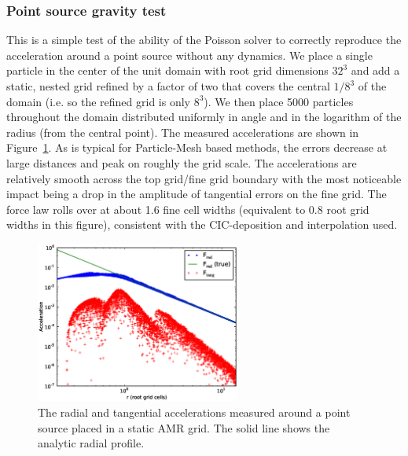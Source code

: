 \subsubsection{Point source gravity test}
\label{sec.test.gravitypointsource}

This is a simple test of the ability of the Poisson solver to
correctly reproduce the acceleration around a point source without any
dynamics.  We place a single particle in the center of the unit domain
with root grid dimensions $32^3$ and add a static, nested grid 
refined by a factor of two that covers the central $1/8^3$ of the
domain (i.e. so the refined grid is only $8^3$).  We then place 5000
particles throughout the domain distributed uniformly in angle and
in the logarithm of the radius (from the central point).  The
measured accelerations are shown in Figure~\ref{fig.gravitytest}.  As
is typical for Particle-Mesh based methods, the errors decrease at
large distances and peak on roughly the grid scale.  The accelerations
are relatively smooth across the top grid/fine grid boundary with the
most noticeable impact being a drop in the amplitude of tangential
errors on the fine grid.  The force law rolls over at about 1.6 fine
cell widths (equivalent to 0.8 root grid widths in this figure),
consistent with the CIC-deposition and interpolation used.

\begin{figure}
\begin{center}
\includegraphics[width=0.6\textwidth]{figures/GravityTest.eps}
\caption{The radial and tangential accelerations measured around a point source placed in a static AMR grid.  The solid line shows the analytic radial profile.}
\label{fig.gravitytest}
\end{center}
\end{figure}

